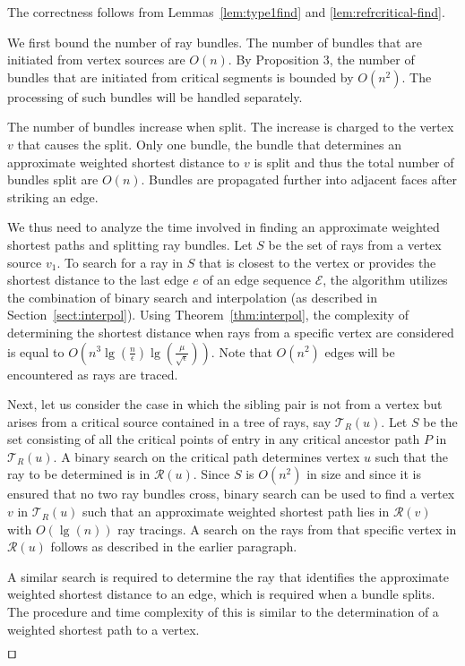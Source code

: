 \documentclass[11pt]{article}
\def\qed{\hbox{\rlap{$\sqcap$}$\sqcup$}}
\def\calT{\mathcal{T}}
\def\calE{\mathcal{E}}
\def\calR{\mathcal{R}}
\newenvironment{proof}{\par\noindent{\bf Proof:}}{\mbox{}\hfill$\qed$\\}
\begin{document}
\begin{proof}
The correctness follows from Lemmas~\ref{lem:type1find} and \ref{lem:refrcritical-find}.

We first bound the number of ray bundles.
The number of bundles that are initiated from vertex sources are $O(n)$. 
By Proposition 3, the number of bundles that are initiated from critical segments is bounded by $O(n^2)$.
The processing of such bundles will be handled separately.

The number of bundles increase when split. 
The increase is charged to the vertex $v$ that causes the split. 
Only one bundle, the bundle that determines an approximate weighted shortest distance to $v$ is split and thus the total number of bundles split are $O(n)$.
Bundles are propagated further into adjacent faces after striking an edge.

We thus need to analyze the time involved in finding an approximate weighted shortest paths and splitting ray bundles.
Let $S$ be the set of rays from a vertex source $v_1$.
To search for  a  ray in $S$ that is closest to the vertex or provides the shortest distance to the last edge $e$ of an edge sequence $\calE$, the algorithm utilizes the combination of binary search and interpolation (as described in Section~\ref{sect:interpol}).
Using Theorem~\ref{thm:interpol}, the complexity of determining the shortest distance  when  rays from a specific vertex are considered
is equal to $O(n^3 \lg (\frac{n}{\epsilon}) \lg (\frac{\mu}{\sqrt{\epsilon}}))$.
Note that $O(n^2)$ edges will be encountered as rays are traced.


Next, let us consider the  case in which the sibling pair is not from a vertex but arises from a  critical source
contained in a tree of rays, say $\calT_R(u)$.
Let $S$ be the set consisting of all the critical points of entry in any critical ancestor path $P$ in $\calT_R(u)$.
A binary search on the critical path determines vertex $u$ such that the ray to be determined is in $\calR(u)$.
Since $S$ is $O(n^2)$ in size and since it is ensured that no two ray bundles cross, binary search can be used to find a vertex $v$  in $\calT_R(u)$ such that an approximate weighted shortest path lies in $\calR(v)$ with $O(\lg (n))$ ray tracings.
A search on the rays from that specific vertex in $\calR(u)$ follows as described in the earlier paragraph. 

A similar search is required to determine the ray that identifies the approximate weighted shortest distance to an edge, which is required when a bundle splits.
The procedure and time complexity of this is similar to the determination of a weighted shortest path to a vertex. 


\end{proof}
\end{document}
